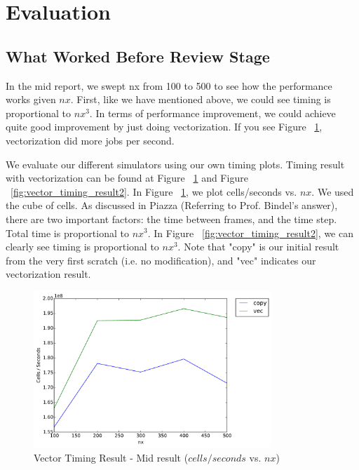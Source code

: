 \section{Evaluation}\label{sec:evaluation}

\subsection{What Worked Before Review Stage}
In the mid report, we swept nx from 100 to 500 to see how the performance works given $nx$. First, like we have mentioned above, we could see timing is proportional to $ nx^{3} $. In terms of performance improvement, we could achieve quite good improvement by just doing vectorization. If you see Figure ~\ref{fig:vector_timing_result1}, vectorization did more jobs per second. 

We evaluate our different simulators using our own timing plots. Timing result with vectorization can be found at Figure ~\ref{fig:vector_timing_result1} and Figure ~\ref{fig:vector_timing_result2}. In Figure ~\ref{fig:vector_timing_result1}, we plot cells/seconds vs. $nx$. We used the cube of cells. As discussed in Piazza (Referring to Prof. Bindel's answer), there are two important factors: the time between frames, and the time step. Total time is proportional to $ nx^{3} $. In Figure ~\ref{fig:vector_timing_result2}, we can clearly see timing is proportional to $ nx^{3} $. Note that "copy" is our initial result from the very first scratch (i.e. no modification), and "vec" indicates our vectorization result.

\begin{figure}[h]
    \centering
    \includegraphics[width=0.8\textwidth]{figs/vec-timing1.pdf}
    \caption{Vector Timing Result - Mid result ($cells/seconds$ vs. $nx$)}
    \label{fig:vector_timing_result1}
\end{figure}

